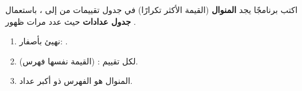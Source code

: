 \begin{statement}
اكتب برنامجًا يجد \textbf{المنوال} (القيمة الأكثر تكرارًا) في جدول تقييمات من  إلى ، باستعمال \textbf{جدول عدادات}  حيث  عدد مرات ظهور .
\end{statement}
\begin{stepsbox}\begin{enumerate}
\item نهيئ  بأصفار: .
\item لكل تقييم :  (القيمة نفسها فهرس).
\item المنوال هو الفهرس ذو أكبر عداد.
\end{enumerate}\end{stepsbox}
